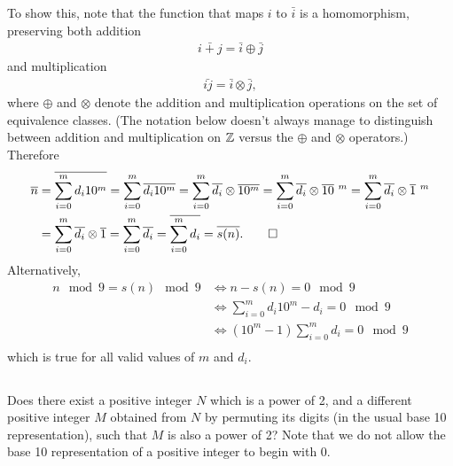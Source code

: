 \documentclass[12pt]{article}
\begin{document}
\begin{mdframed}
  To show this, note that the function that maps $i$ to $\bar i$ is a
  homomorphism, preserving both addition
  \begin{align*}
  \bar{i + j} = \bar i \oplus \bar j
  \end{align*}
  and multiplication
  \begin{align*}
  \bar{ij} = \bar i \otimes \bar j,
  \end{align*}
  where $\oplus$ and $\otimes$ denote the addition and multiplication
  operations on the set of equivalence classes. (The notation below doesn't
  always manage to distinguish between addition and multiplication on $\Z$
  versus the $\oplus$ and $\otimes$ operators.) Therefore
  \begin{align*}
    \bar n &= \bar{\sum_{i=0}^m d_i 10^m}
           = \sum_{i=0}^m \bar{d_i 10^m}
           = \sum_{i=0}^m \bar{d_i} \otimes \bar{10^m}
           = \sum_{i=0}^m \bar{d_i} \otimes \bar{10}~^m
           = \sum_{i=0}^m \bar{d_i} \otimes \bar{1}~^m\\
           &= \sum_{i=0}^m \bar{d_i} \otimes \bar{1}
           = \sum_{i=0}^m \bar{d_i}
           = \bar{\sum_{i=0}^m d_i} = \bar{s(n)}. \qed\\
  \end{align*}
  Alternatively,
  \begin{align*}
    n \mod 9 = s(n) \mod 9
    &\iff n - s(n) = 0 \mod 9\\
    &\iff \sum_{i=0}^m d_i 10^m - d_i = 0 \mod 9\\
    &\iff (10^m - 1)\sum_{i=0}^m d_i = 0 \mod 9\\
  \end{align*}
  which is true for all valid values of $m$ and $d_i$.
\end{mdframed}


\newpage
\subsection{}
Does there exist a positive integer $N$ which is a power of 2, and a different
positive integer $M$ obtained from $N$ by permuting its digits (in the usual
base 10 representation), such that $M$ is also a power of 2? Note that we do
not allow the base 10 representation of a positive integer to begin with 0.
\end{document}
